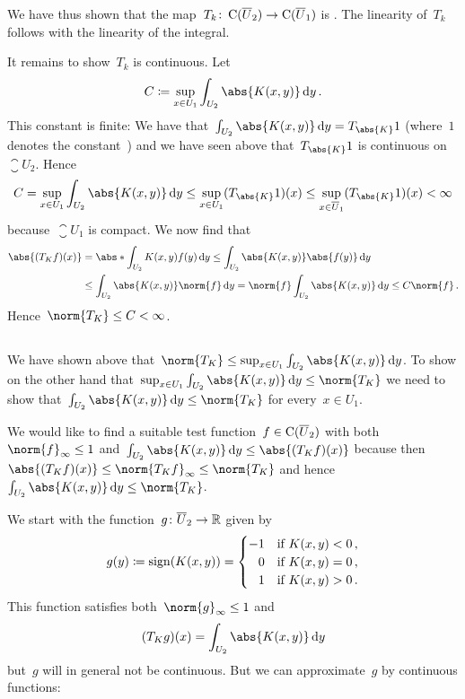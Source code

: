 We have thus shown that the map~$T_k \colon \operatorname{C}(\overline{U}_2) \to \operatorname{C}(\overline{U}_1)$ is {\welldef}.
The linearity of~$T_k$ follows with the linearity of the integral.

It remains to show~$T_k$ is continuous.
Let
\[
            C
  \defined  \sup_{x \in U_1} \int_{U_2} \abs{K(x,y)} \dd{y} \,.
\]
This constant is finite:
We have that~$\int_{U_2} \abs{K(x,y)} \dd{y} = T_{\abs{K}} 1$ (where~$1$ denotes the constant~) and we have seen above that~$T_{\abs{K}} 1$ is continuous on~$\closure{U}_2$.
Hence
\[
        C
  =     \sup_{x \in U_1} \int_{U_2} \abs{K(x,y)} \dd{y}
  \leq  \sup_{x \in U_1} (T_{\abs{K}} 1)(x)
  \leq  \sup_{x \in \closure{U}_1} (T_{\abs{K}} 1)(x)
  <     \infty
\]
because~$\closure{U}_1$ is compact.
We now find that
\begin{align*}
        \abs{(T_K f)(x)}
  &=    \abs*{ \int_{U_2} K(x,y) f(y) \dd{y} }
   \leq \int_{U_2} \abs{K(x,y)} \abs{f(y)} \dd{y} \\
  &\leq \int_{U_2} \abs{K(x,y)} \norm{f} \dd{y}
   =    \norm{f} \int_{U_2} \abs{K(x,y)} \dd{y}
   \leq C \norm{f} \,.
\end{align*}
Hence~$\norm{T_K} \leq C < \infty$.





\subsection{}

We have shown above that~$\norm{T_K} \leq \sup_{x \in U_1} \int_{U_2} \abs{K(x,y)} \dd{y}$.
To show on the other hand that~$\sup_{x \in U_1} \int_{U_2} \abs{K(x,y)} \dd{y} \leq \norm{T_K}$ we need to show that~$\int_{U_2} \abs{K(x,y)} \dd{y} \leq \norm{T_K}$ for every~$x \in U_1$.

We would like to find a suitable test function~$f \in \operatorname{C}(\overline{U}_2)$ with both~$\norm{f}_\infty \leq 1$ and~$\int_{U_2} \abs{K(x,y)} \dd{y} \leq \abs{(T_K f)(x)}$ because then~$\abs{(T_K f)(x)} \leq \norm{T_K f}_\infty \leq \norm{T_K}$ and hence~$\int_{U_2} \abs{K(x,y)} \dd{y} \leq \norm{T_K}$.

We start with the function~$g \colon \overline{U}_2 \to \mathbb{R}$ given by
\[
            g(y)
  \coloneqq  \operatorname{sign}(K(x,y))
  =         \begin{cases}
                        -1  & \text{if~$K(x,y) < 0$}  \,, \\
              \phantom{-}0  & \text{if~$K(x,y) = 0$}  \,, \\
              \phantom{-}1  & \text{if~$K(x,y) > 0$}  \,.
            \end{cases}
\]
This function satisfies both~$\norm{g}_\infty \leq 1$ and
\begin{equation}
  \label{property of g}
    (T_K g)(x)
  = \int_{U_2} \abs{K(x,y)} \dd{y}
\end{equation}
but~$g$ will in general not be continuous.
But we can approximate~$g$ by continuous functions:

